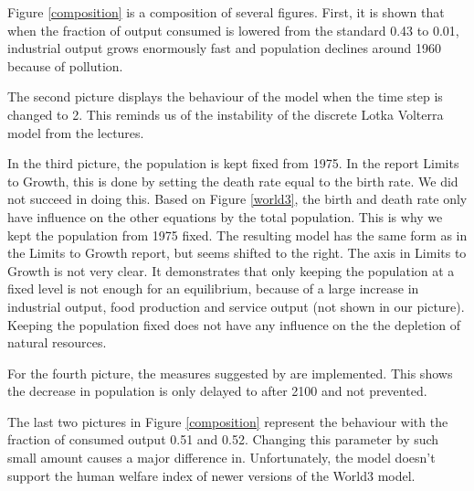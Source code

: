 \documentclass[10pt,a4paper]{scrartcl}
\begin{document}
Figure \ref{composition} is a composition of several figures. First, it is shown that when the fraction of output consumed is lowered from the standard 0.43 to 0.01, industrial output grows enormously fast and population declines around 1960 because of pollution.

The second picture displays the behaviour of the model when the time step is changed to 2. This reminds us of the instability of the discrete Lotka Volterra model from the lectures.

In the third picture, the population is kept fixed from 1975. In the report Limits to Growth, this is done by setting the death rate equal to the birth rate. We did not succeed in doing this. Based on Figure \ref{world3}, the birth and death rate only have influence on the other equations by the total population. This is why we kept the population from 1975 fixed. The resulting model has the same form as in the Limits to Growth report, but seems shifted to the right. The axis in Limits to Growth is not very clear. It demonstrates that only keeping the population at a fixed level is not enough for an equilibrium, because of a large increase in industrial output, food production and service output (not shown in our picture). Keeping the population fixed does not have any influence on the the depletion of natural resources.

For the fourth picture, the measures suggested by \cite{vermeulen1976parameter} are implemented. This shows the decrease in population is only delayed to after 2100 and not prevented.

The last two pictures in Figure \ref{composition} represent the behaviour with the fraction of consumed output 0.51 and 0.52. Changing this parameter by such small amount causes a major difference in. Unfortunately, the model doesn't support the human welfare index of newer versions of the World3 model.
\end{document}
